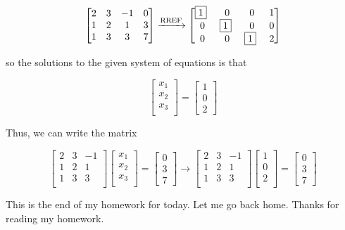 \documentclass{article}
\begin{document}
\begin{equation}
  \begin{bmatrix}
    2 & 3& -1 & 0 \\
    1 & 2 & 1 & 3 \\
    1 & 3 & 3 & 7 \\
  \end{bmatrix}
\xrightarrow[]{\text{RREF}}
\begin{bmatrix}
  \p & 0 & 0 & 1 \\
  0 & \p & 0 & 0 \\
  0 & 0 & \p & 2 \\
\end{bmatrix}
\end{equation}

so the solutions to the given system of equations is that

\begin{equation}
  \begin{bmatrix}
    x_1 \\
    x_2 \\
    x_3 \\
  \end{bmatrix}
  =
  \begin{bmatrix}
    1 \\
    0 \\
    2
  \end{bmatrix}
\end{equation}

Thus, we can write the matrix

\begin{equation}
  \begin{bmatrix}
    2 & 3& -1 \\
    1 & 2 & 1 \\
    1 & 3 & 3 \\
  \end{bmatrix}
  \begin{bmatrix}
    x_1 \\
    x_2 \\
    x_3 \\
  \end{bmatrix}
  =
  \begin{bmatrix}
    0 \\
    3 \\
    7
  \end{bmatrix}
  \xrightarrow[]{}
  \begin{bmatrix}
    2 & 3& -1 \\
    1 & 2 & 1 \\
    1 & 3 & 3 \\
  \end{bmatrix}
  \begin{bmatrix}
    1 \\
    0 \\
    2 \\
  \end{bmatrix}
  =
  \begin{bmatrix}
    0 \\
    3 \\
    7
  \end{bmatrix}
\end{equation}

\bigskip

This is the end of my homework for today. Let me go back home. Thanks for reading my homework.
\end{document}
